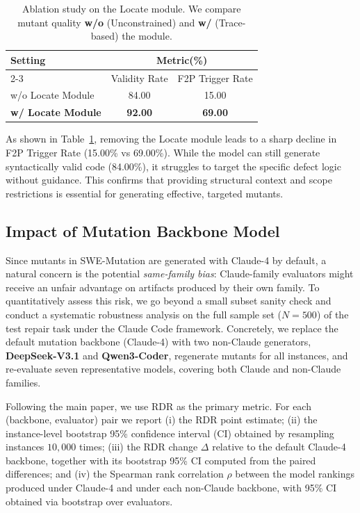 \documentclass[11pt]{article}
\begin{document}
\begin{table}[h]
  \centering
  \small
  \renewcommand{\arraystretch}{1.2}
  \setlength{\tabcolsep}{8pt}
  \caption{
    Ablation study on the Locate module. We compare mutant quality \textbf{w/o} (Unconstrained) and \textbf{w/} (Trace-based) the module.
  }
  \begin{tabular}{l cc}
    \toprule
    \multirow{2}{*}{Setting} & \multicolumn{2}{c}{Metric(\%)} \\
    \cmidrule(lr){2-3}
    & Validity Rate & F2P Trigger Rate \\
    \midrule
    w/o Locate Module       & 84.00 & 15.00 \\
    \textbf{w/ Locate Module} & \textbf{92.00} & \textbf{69.00} \\
    \bottomrule
  \end{tabular}
  \label{tab:ablation_locate}
\end{table}

As shown in Table~\ref{tab:ablation_locate}, removing the Locate module leads to a sharp decline in F2P Trigger Rate (15.00\% vs 69.00\%). While the model can still generate syntactically valid code (84.00\%), it struggles to target the specific defect logic without guidance. This confirms that providing structural context and scope restrictions is essential for generating effective, targeted mutants.

\subsection{Impact of Mutation Backbone Model}
\label{sec:ablation_backbone}
Since mutants in SWE-Mutation are generated with Claude-4 by default, a natural concern is the potential \emph{same-family bias}: Claude-family evaluators might receive an unfair advantage on artifacts produced by their own family. To quantitatively assess this risk, we go beyond a small subset sanity check and conduct a systematic robustness analysis on the full sample set ($N=500$) of the test repair task under the Claude Code framework. Concretely, we replace the default mutation backbone (Claude-4) with two non-Claude generators, \textbf{DeepSeek-V3.1} and \textbf{Qwen3-Coder}, regenerate mutants for all instances, and re-evaluate seven representative models, covering both Claude and non-Claude families.

Following the main paper, we use RDR as the primary metric. For each (backbone, evaluator) pair we report (i) the RDR point estimate; (ii) the instance-level bootstrap 95\% confidence interval (CI) obtained by resampling instances $10{,}000$ times; (iii) the RDR change $\Delta$ relative to the default Claude-4 backbone, together with its bootstrap 95\% CI computed from the paired differences; and (iv) the Spearman rank correlation $\rho$ between the model rankings produced under Claude-4 and under each non-Claude backbone, with 95\% CI obtained via bootstrap over evaluators.
\end{document}
